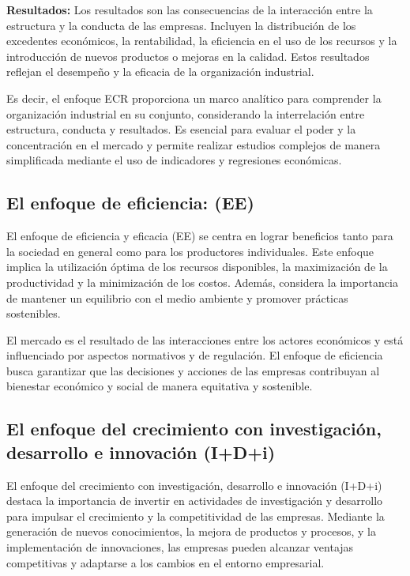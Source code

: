 \documentclass[
  doc,
  floatsintext,
  longtable,
  a4paper,
  nolmodern,
  notxfonts,
  notimes,
  colorlinks=true,linkcolor=blue,citecolor=blue,urlcolor=blue]{apa7}
\begin{document}
\textbf{Resultados:} Los resultados son las consecuencias de la
interacción entre la estructura y la conducta de las empresas. Incluyen
la distribución de los excedentes económicos, la rentabilidad, la
eficiencia en el uso de los recursos y la introducción de nuevos
productos o mejoras en la calidad. Estos resultados reflejan el
desempeño y la eficacia de la organización industrial.

Es decir, el enfoque ECR proporciona un marco analítico para comprender
la organización industrial en su conjunto, considerando la interrelación
entre estructura, conducta y resultados. Es esencial para evaluar el
poder y la concentración en el mercado y permite realizar estudios
complejos de manera simplificada mediante el uso de indicadores y
regresiones económicas.

\subsection{El enfoque de eficiencia:
(EE)}\label{el-enfoque-de-eficiencia-ee}

El enfoque de eficiencia y eficacia (EE) se centra en lograr beneficios
tanto para la sociedad en general como para los productores
individuales. Este enfoque implica la utilización óptima de los recursos
disponibles, la maximización de la productividad y la minimización de
los costos. Además, considera la importancia de mantener un equilibrio
con el medio ambiente y promover prácticas sostenibles.

El mercado es el resultado de las interacciones entre los actores
económicos y está influenciado por aspectos normativos y de regulación.
El enfoque de eficiencia busca garantizar que las decisiones y acciones
de las empresas contribuyan al bienestar económico y social de manera
equitativa y sostenible.

\subsection{El enfoque del crecimiento con investigación, desarrollo e
innovación
(I+D+i)}\label{el-enfoque-del-crecimiento-con-investigaciuxf3n-desarrollo-e-innovaciuxf3n-idi}

El enfoque del crecimiento con investigación, desarrollo e innovación
(I+D+i) destaca la importancia de invertir en actividades de
investigación y desarrollo para impulsar el crecimiento y la
competitividad de las empresas. Mediante la generación de nuevos
conocimientos, la mejora de productos y procesos, y la implementación de
innovaciones, las empresas pueden alcanzar ventajas competitivas y
adaptarse a los cambios en el entorno empresarial.
\end{document}
